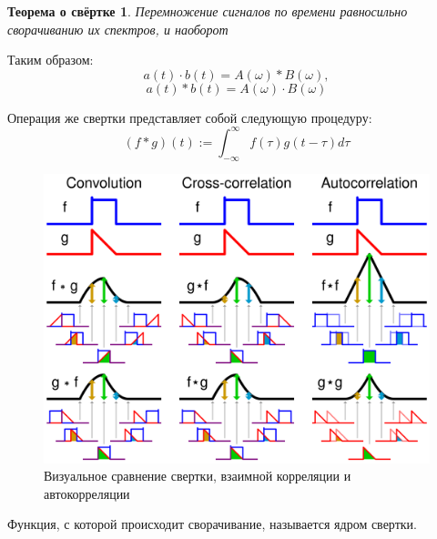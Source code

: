 \newtheorem*{Convolution_theorem}{Теорема о свёртке}
\begin{Convolution_theorem}
	Перемножение сигналов по времени равносильно сворачиванию их спектров, и наоборот
\end{Convolution_theorem}

Таким образом:
\begin{equation}\label{eq:ThConvolution1}
	a(t) \cdot b(t) = A(\omega) * B(\omega),
\end{equation}
\begin{equation}\label{eq:ThConvolution2}
	a(t) * b(t) = A(\omega) \cdot B(\omega)
\end{equation}

Операция же свертки представляет собой следующую процедуру:
\begin{equation}\label{eq:Convolution}
	(f * g)(t) := \int_{-\infty}^{\infty} f(\tau) g(t-\tau) d\tau
\end{equation}

\begin{figure}[H]
	\centering
	\includegraphics[scale=0.14]{images/Comparison_convolution_correlation}
	\caption{Визуальное сравнение свертки, взаимной корреляции и автокорреляции}
	\label{fig:Comparison_convolution_correlation}
\end{figure}

\noindent Функция, с которой происходит сворачивание, называется ядром свертки.

